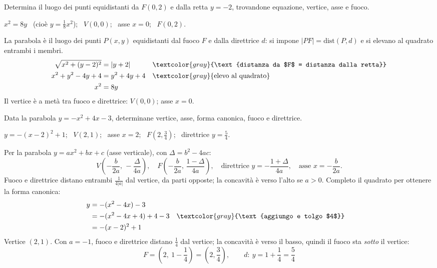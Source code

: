 
\begin{question}[ID=1.4, subtitle={Luogo equidistante da $F(0,2)$ e dalla retta $y=-2$}, difficulty=media, tags={parabola, luogo}]
Determina il luogo dei punti equidistanti da $F(0,2)$ e dalla retta $y=-2$, trovandone equazione, vertice, asse e fuoco.
\begin{solution}
$x^2=8y$ \ (cioè $y=\tfrac18x^2$); \ $V(0,0)$; \ asse $x=0$; \ $F(0,2)$.
\end{solution}
\begin{explanation}
La parabola è il luogo dei punti $P(x,y)$ equidistanti dal fuoco $F$ e dalla direttrice $d$: si impone $|PF|=\text{dist}(P,d)$ e si elevano al quadrato entrambi i membri.
\[\begin{aligned}
\sqrt{x^2+(y-2)^2} &= |y+2| && \textcolor{gray}{\text{distanza da $F$ = distanza dalla retta}}\\
x^2+y^2-4y+4 &= y^2+4y+4 && \textcolor{gray}{\text{elevo al quadrato}}\\
x^2 &= 8y
\end{aligned}\]
Il vertice è a metà tra fuoco e direttrice: $V(0,0)$; asse $x=0$.
\end{explanation}
\end{question}


\begin{question}[ID=1.5, subtitle={Parabola $y=-x^2+4x-3$: forma canonica e fuoco}, difficulty=media, tags={parabola}]
Data la parabola $y=-x^2+4x-3$, determinane vertice, asse, forma canonica, fuoco e direttrice.
\begin{solution}
$y=-(x-2)^2+1$; \ $V(2,1)$; \ asse $x=2$; \ $F\left(2,\tfrac34\right)$; \ direttrice $y=\tfrac54$.
\end{solution}
\begin{explanation}
Per la parabola $y=ax^2+bx+c$ (asse verticale), con $\Delta=b^2-4ac$:
\[ V\left(-\dfrac{b}{2a},\,-\dfrac{\Delta}{4a}\right), \quad F\left(-\dfrac{b}{2a},\,\dfrac{1-\Delta}{4a}\right), \quad \text{direttrice } y=-\dfrac{1+\Delta}{4a}, \quad \text{asse } x=-\dfrac{b}{2a}. \]
Fuoco e direttrice distano entrambi $\tfrac{1}{4|a|}$ dal vertice, da parti opposte; la concavità è verso l'alto se $a>0$.
Completo il quadrato per ottenere la forma canonica:
\[\begin{aligned}
y &= -(x^2-4x)-3\\
&= -(x^2-4x+4)+4-3 && \textcolor{gray}{\text{aggiungo e tolgo $4$}}\\
&= -(x-2)^2+1
\end{aligned}\]
Vertice $(2,1)$. Con $a=-1$, fuoco e direttrice distano $\tfrac{1}{4}$ dal vertice; la concavità è verso il basso, quindi il fuoco sta \emph{sotto} il vertice:
\[ F=\left(2,\ 1-\dfrac14\right)=\left(2,\dfrac34\right), \qquad d:\ y=1+\dfrac14=\dfrac54 \]
\end{explanation}
\end{question}

